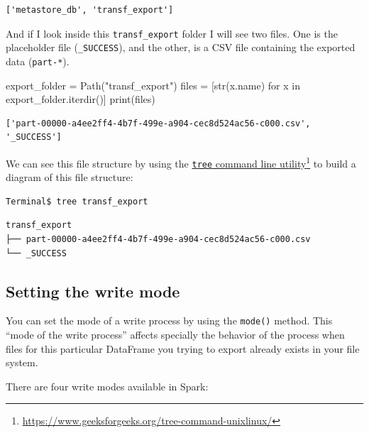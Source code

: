 \documentclass[
  11pt,
  letterpaper,
  DIV=11,
  numbers=noendperiod]{scrreprt}
\newenvironment{Shaded}{\begin{snugshade}}{\end{snugshade}}
\newcommand{\BuiltInTok}[1]{\textcolor[rgb]{0.00,0.23,0.31}{#1}}
\newcommand{\ControlFlowTok}[1]{\textcolor[rgb]{0.00,0.23,0.31}{#1}}
\newcommand{\KeywordTok}[1]{\textcolor[rgb]{0.00,0.23,0.31}{#1}}
\newcommand{\NormalTok}[1]{\textcolor[rgb]{0.00,0.23,0.31}{#1}}
\newcommand{\OperatorTok}[1]{\textcolor[rgb]{0.37,0.37,0.37}{#1}}
\newcommand{\StringTok}[1]{\textcolor[rgb]{0.13,0.47,0.30}{#1}}
\begin{document}
\begin{verbatim}
['metastore_db', 'transf_export']
\end{verbatim}

And if I look inside this \texttt{transf\_export} folder I will see two
files. One is the placeholder file (\texttt{\_SUCCESS}), and the other,
is a CSV file containing the exported data (\texttt{part-*}).

\begin{Shaded}
\begin{Highlighting}[]
\NormalTok{export\_folder }\OperatorTok{=}\NormalTok{ Path(}\StringTok{"transf\_export"}\NormalTok{)}
\NormalTok{files }\OperatorTok{=}\NormalTok{ [}\BuiltInTok{str}\NormalTok{(x.name) }\ControlFlowTok{for}\NormalTok{ x }\KeywordTok{in}\NormalTok{ export\_folder.iterdir()]}
\BuiltInTok{print}\NormalTok{(files)}
\end{Highlighting}
\end{Shaded}

\begin{verbatim}
['part-00000-a4ee2ff4-4b7f-499e-a904-cec8d524ac56-c000.csv', '_SUCCESS']
\end{verbatim}

We can see this file structure by using the
\href{https://www.geeksforgeeks.org/tree-command-unixlinux/}{\texttt{tree}
command line utility}\footnote{\url{https://www.geeksforgeeks.org/tree-command-unixlinux/}}
to build a diagram of this file structure:

\begin{verbatim}
Terminal$ tree transf_export
\end{verbatim}

\begin{verbatim}
transf_export
├── part-00000-a4ee2ff4-4b7f-499e-a904-cec8d524ac56-c000.csv
└── _SUCCESS
\end{verbatim}

\hypertarget{setting-the-write-mode}{%
\subsection{Setting the write mode}\label{setting-the-write-mode}}

You can set the mode of a write process by using the \texttt{mode()}
method. This ``mode of the write process'' affects specially the
behavior of the process when files for this particular DataFrame you
trying to export already exists in your file system.

There are four write modes available in Spark:
\end{document}
